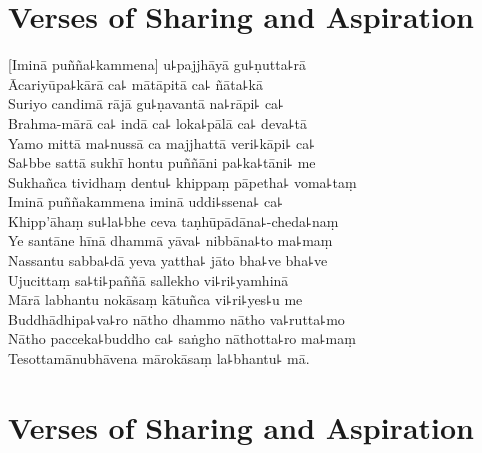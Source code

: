 
\chapter*[Sharing and Aspiration]{Verses of Sharing and Aspiration}%

\delegateSetUseNext

\begin{leader}
\end{leader}


[Iminā puñña꜕kammena] u꜕pajjhāyā gu꜕ṇutta꜕rā\\
Ācariyūpa꜕kārā ca꜕ mātāpitā ca꜕ ñāta꜕kā\\
Suriyo candimā rājā gu꜕ṇavantā na꜕rāpi꜕ ca꜕\\
Brahma-mārā ca꜕ indā ca꜕ loka꜕pālā ca꜕ deva꜕tā\\
Yamo mittā ma꜕nussā ca majjhattā veri꜕kāpi꜕ ca꜕\\
Sa꜕bbe sattā sukhī hontu puññāni pa꜕ka꜕tāni꜕ me\\
Sukhañca tividhaṃ dentu꜕ khippaṃ pāpetha꜕ voma꜕taṃ\\
Iminā puññakammena iminā uddi꜕ssena꜕ ca꜕\\
Khipp'āhaṃ su꜕la꜕bhe ceva taṇhūpādāna꜕-cheda꜕naṃ\\
Ye santāne hīnā dhammā yāva꜕ nibbāna꜕to ma꜕maṃ\\
Nassantu sabba꜕dā yeva yattha꜕ jāto bha꜕ve bha꜕ve\\
Ujucittaṃ sa꜕ti꜕paññā sallekho vi꜕ri꜕yamhinā\\
Mārā labhantu nokāsaṃ kātuñca vi꜕ri꜕yes꜕u me\\
Buddhādhipa꜕va꜕ro nātho dhammo nātho va꜕rutta꜕mo\\
Nātho pacceka꜕buddho ca꜕ saṅgho nāthotta꜕ro ma꜕maṃ\\
Tesottamānubhāvena mārokāsaṃ la꜕bhantu꜕ mā.

\chapter[Sharing and Aspiration]{Verses of Sharing and Aspiration}%

\begin{leader}
\end{leader}

